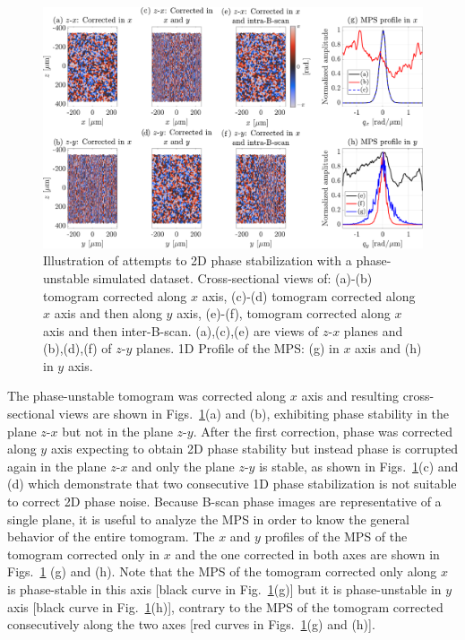 \begin{figure}[htb!]
	\centering
	\includegraphics[width=\textwidth]{Figures/SHARP/PhaseStabilization/PhaseStabiliaztion2D.pdf}
	\caption[Illustration of attempts to 2D phase stabilization with a phase-unstable simulated dataset.]{Illustration of attempts to 2D phase stabilization with a phase-unstable simulated dataset. Cross-sectional views of: (a)-(b) tomogram corrected along $x$ axis, (c)-(d) tomogram corrected along $x$ axis and then along $y$ axis, (e)-(f), tomogram corrected along $x$ axis and then inter-B-scan. (a),(c),(e) are views of $z$-$x$ planes and (b),(d),(f) of $z$-$y$ planes. 1D Profile of the MPS: (g) in $x$ axis and (h) in $y$ axis.}
	\label{fig:PhaseStable2D}
\end{figure}

The phase-unstable tomogram was corrected along $x$ axis and resulting cross-sectional views are shown in Figs.~\ref{fig:PhaseStable2D}(a) and (b), exhibiting phase stability in the plane $z$-$x$ but not in the plane $z$-$y$. After the first correction, phase was corrected along $y$ axis expecting to obtain 2D phase stability but instead phase is corrupted again in the plane $z$-$x$ and only the plane $z$-$y$ is stable, as shown in Figs.~\ref{fig:PhaseStable2D}(c) and (d) which demonstrate that two consecutive 1D phase stabilization is not suitable to correct 2D phase noise. Because B-scan phase images are representative of a single plane, it is useful to analyze the MPS in order to know the general behavior of the entire tomogram. The $x$ and $y$ profiles of the MPS of the tomogram corrected only in $x$ and the one corrected in both axes are shown in Figs.~\ref{fig:PhaseStable2D} (g) and (h). Note that the MPS of the tomogram corrected only along $x$ is phase-stable in this axis [black curve in Fig.~\ref{fig:PhaseStable2D}(g)] but it is phase-unstable in $y$ axis [black curve in Fig.~\ref{fig:PhaseStable2D}(h)], contrary to the MPS of the tomogram corrected consecutively along the two axes [red curves in Figs.~\ref{fig:PhaseStable2D}(g) and (h)].

